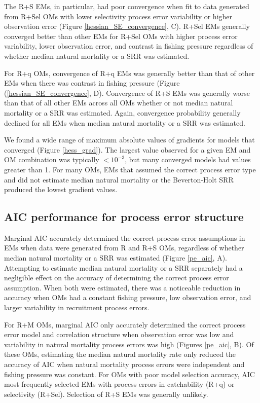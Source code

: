 \documentclass[
  12pt,
]{article}
\begin{document}
The R+S EMs, in particular, had poor convergence when fit to data
generated from R+Sel OMs with lower selectivity process error
variability or higher observation error (Figure
\ref{hessian_SE_convergence}, C). R+Sel EMs generally converged better
than other EMs for R+Sel OMs with higher process error variability,
lower observation error, and contrast in fishing pressure regardless of
whether median natural mortality or a SRR was estimated.

For R+q OMs, convergence of R+q EMs was generally better than that of
other EMs when there was contrast in fishing pressure (Figure
(\ref{hessian_SE_convergence}, D). Convergence of R+S EMs was generally
worse than that of all other EMs across all OMs whether or not median
natural mortality or a SRR was estimated. Again, convergence probability
generally declined for all EMs when median natural mortality or a SRR
was estimated.

We found a wide range of maximum absolute values of gradients for models
that converged (Figure \ref{hess_grad}). The largest value observed for
a given EM and OM combination was typically \(<10^{-3}\), but many
converged models had values greater than 1. For many OMs, EMs that
assumed the correct process error type and did not estimate median
natural mortality or the Beverton-Holt SRR produced the lowest gradient
values.

\hypertarget{aic-performance-for-process-error-structure}{%
\subsection*{AIC performance for process error
structure}\label{aic-performance-for-process-error-structure}}

Marginal AIC accurately determined the correct process error assumptions
in EMs when data were generated from R and R+S OMs, regardless of
whether median natural mortality or a SRR was estimated (Figure
\ref{pe_aic}, A). Attempting to estimate median natural mortality or a
SRR separately had a negligible effect on the accuracy of determining
the correct process error assumption. When both were estimated, there
was a noticeable reduction in accuracy when OMs had a constant fishing
pressure, low observation error, and larger variability in recruitment
process errors.

For R+M OMs, marginal AIC only accurately determined the correct process
error model and correlation structure when observation error was low and
variability in natural mortality process errors was high (Figures
\ref{pe_aic}, B). Of these OMs, estimating the median natural mortality
rate only reduced the accuracy of AIC when natural mortality process
errors were independent and fishing pressure was constant. For OMs with
poor model selection accuracy, AIC most frequently selected EMs with
process errors in catchability (R+q) or selectivity (R+Sel). Selection
of R+S EMs was generally unlikely.
\end{document}
